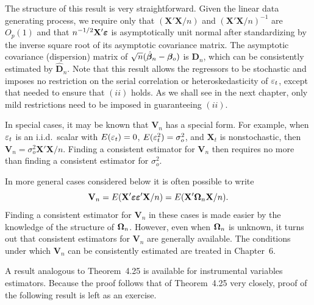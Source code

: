 The structure of this result is very straightforward. Given the linear
data generating process, we require only that $(\mathbf{X}'\mathbf{X}/n)$ and $(\mathbf{X}'\mathbf{X}/n)^{-1}$ are
$O_p(1)$ and that $n^{-1/2}\mathbf{X}'\boldsymbol{\varepsilon}$ is asymptotically unit normal after standardizing
by the inverse square root of its asymptotic covariance matrix. The asymptotic covariance (dispersion) matrix of $\sqrt{n}(\hat{\boldsymbol{\beta}}_n - \boldsymbol{\beta}_o)$ is $\mathbf{D}_n$, which can be
consistently estimated by $\hat{\mathbf{D}}_n$. Note that this result allows the regressors
to be stochastic and imposes no restriction on the serial correlation or heteroskedasticity of $\varepsilon_t$, except that needed to ensure that $(ii)$ holds. As we
shall see in the next chapter, only mild restrictions need to be imposed in
guaranteeing $(ii)$.

In special cases, it may be known that $\mathbf{V}_n$ has a special form. For example, when $\varepsilon_t$ is an i.i.d.\ scalar with $E(\varepsilon_t) = 0$, $E(\varepsilon_t^2) = \sigma_o^2$, and $\mathbf{X}_t$ is
nonstochastic, then $\mathbf{V}_n = \sigma_o^2\mathbf{X}'\mathbf{X}/n$. Finding a consistent estimator for $\mathbf{V}_n$
then requires no more than finding a consistent estimator for $\sigma_o^2$.

In more general cases considered below it is often possible to write
\[
\mathbf{V}_n = E(\mathbf{X}'\boldsymbol{\varepsilon}\boldsymbol{\varepsilon}'\mathbf{X}/n) = E(\mathbf{X}'\boldsymbol{\Omega}_n\mathbf{X}/n).
\]
Finding a consistent estimator for $\mathbf{V}_n$ in these cases is made easier by the
knowledge of the structure of $\boldsymbol{\Omega}_n$. However, even when $\boldsymbol{\Omega}_n$ is unknown, it
turns out that consistent estimators for $\mathbf{V}_n$ are generally available. The
conditions under which $\mathbf{V}_n$ can be consistently estimated are treated in
Chapter~6.

A result analogous to Theorem~4.25 is available for instrumental variables
estimators. Because the proof follows that of Theorem~4.25 very closely,
proof of the following result is left as an exercise.

